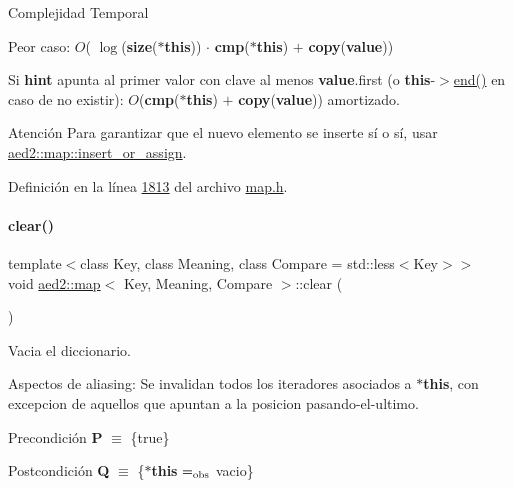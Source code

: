 \begin{DoxyDescription}
\item[Complejidad Temporal]
\begin{DoxyItemize}
\item Peor caso\+: $O$( $\log$({\bfseries size}({\bfseries $\ast$this})) $\cdot$ {\bfseries cmp}({\bfseries $\ast$this}) $+$ {\bfseries copy}({\bfseries value}))
\item Si {\bfseries hint} apunta al primer valor con clave al menos {\bfseries value}.first (o {\bfseries this}-\/$>$\hyperlink{classaed2_1_1map_a76023e6a56cb625513e1b5ea028bf983_a76023e6a56cb625513e1b5ea028bf983}{end()} en caso de no existir)\+: $O$({\bfseries cmp}({\bfseries $\ast$this}) $+$ {\bfseries copy}({\bfseries value})) amortizado. 
\end{DoxyItemize}
\end{DoxyDescription}

\begin{DoxyAttention}{Atención}
Para garantizar que el nuevo elemento se inserte sí o sí, usar \hyperlink{classaed2_1_1map_a2ef6723c183916276b0afc4a4c721475_a2ef6723c183916276b0afc4a4c721475}{aed2\+::map\+::insert\+\_\+or\+\_\+assign}. 
\end{DoxyAttention}


Definición en la línea \hyperlink{map_8h_source_l01813}{1813} del archivo \hyperlink{map_8h_source}{map.\+h}.

\mbox{\label{classaed2_1_1map_a2bfa5165825979bf2431db55bc6bc9ca_a2bfa5165825979bf2431db55bc6bc9ca}} 
\paragraph{\texorpdfstring{clear()}{clear()}}
{\footnotesize\ttfamily template$<$class Key, class Meaning, class Compare = std\+::less$<$\+Key$>$$>$ \\
void \hyperlink{classaed2_1_1map}{aed2\+::map}$<$ Key, Meaning, Compare $>$\+::clear (\begin{DoxyParamCaption}{ }\end{DoxyParamCaption})\hspace{0.3cm}{\ttfamily [inline]}}



Vacia el diccionario. 

\begin{DoxyParagraph}{Aspectos de aliasing\+:}
Se invalidan todos los iteradores asociados a {\bfseries $\ast$this}, con excepcion de aquellos que apuntan a la posicion pasando-\/el-\/ultimo.
\end{DoxyParagraph}
\begin{DoxyPrecond}{Precondición}
{\bfseries P} $\equiv$ \{true\} 
\end{DoxyPrecond}
\begin{DoxyPostcond}{Postcondición}
{\bfseries Q} $\equiv$ \{{\bfseries $\ast$this} $=_{\rm obs}$ vacio\}
\end{DoxyPostcond}

